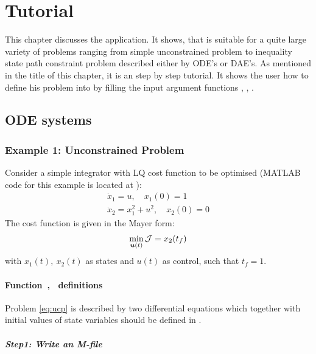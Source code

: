 \chapter{Tutorial}
\label{cha:tutorial}

This chapter discusses the  application. It shows, that
 is suitable for a quite large variety of problems
ranging from simple unconstrained problem to inequality state path
constraint problem described either by ODE's or DAE's. As mentioned in
the title of this chapter, it is an step by step tutorial. It shows
the user how to define his problem into  by filling the
input argument functions , , . 

\section{ODE systems}
\label{sec:odes}

\subsection{Example 1: Unconstrained Problem}
\label{sec:unconprob}

Consider a simple integrator with LQ cost function to be
optimised \citep{luu91,raj01} (MATLAB code for this example is located
at ): 
\begin{gather}
\dot{x}_1 = u, \quad x_{1}(0) = 1\\
\dot{x}_2 = x^{2}_{1} + u^{2}, \quad x_{2}(0) = 0
\end{gather}
The cost function is given in the Mayer form:
\begin{equation}
\min_{\ve{u}(t)} \mf{J} = x_{2}(t_{f}) \label{eq:ucp} 
\end{equation} with $x_{1}(t),~x_{2}(t)$ as states and $u(t)$ as
control, such that $t_{f} = 1$.

\subsubsection{Function~,~  definitions}
\label{sec:unconprob-fundef}

Problem \eqref{eq:ucp} is described by two differential equations
which together with initial values of state variables should be
defined in .

\paragraph{Step1: Write an M-file~}

